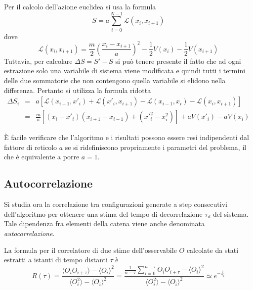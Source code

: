Per il calcolo dell'azione euclidea si usa la formula
$$S = a\displaystyle\sum\limits_{i=0}^{N-1} \mathcal{L}(x_{i},x_{i+1})$$
dove
$$\mathcal{L}(x_{i},x_{i+1}) = \frac{m}{2}\left(\frac{x_{i}-x_{i+1}}{a}\right)^{2}-\frac{1}{2}V(x_{i})-\frac{1}{2}V(x_{i+1})$$
Tuttavia, per calcolare $\Delta S = S'-S$ si può tenere presente il fatto che ad ogni estrazione solo una variabile di sistema viene modificata e quindi tutti i termini delle due sommatorie che non contengono quella variabile si elidono nella differenza. Pertanto si utilizza la formula ridotta
\begin{eqnarray*}
 \Delta S_i &=& a[\mathcal{L}(x_{i-1},x'_{i})+\mathcal{L}(x'_{i},x_{i+1})-\mathcal{L}(x_{i-1},x_{i})-\mathcal{L}(x_{i},x_{i+1})]\\
   &=& \tfrac{m}{a}[(x_{i}-x'_{i})(x_{i+1}+x_{i-1})+(x'^2_i-x^2_i)]+aV(x'_i)-aV(x_i)
\end{eqnarray*}

È facile verificare che l'algoritmo e i risultati possono essere resi indipendenti dal fattore di reticolo $a$ se si ridefiniscono propriamente i parametri del problema, il che è equivalente a porre $a=1$.
\newpage
\subsection{Autocorrelazione}

Si studia ora la correlazione tra configurazioni generate a step consecutivi dell'algoritmo per ottenere una stima del tempo di decorrelazione $\tau_d$ del sistema. Tale dipendenza fra elementi della catena viene anche denominata \textit{autocorrelazione}.

La formula per il correlatore di due stime dell'osservabile $O$ calcolate da stati estratti a istanti di tempo distanti $\tau$ è
$$R(\tau)=\frac{\langle O_iO_{i+\tau}\rangle-\langle O_i\rangle^2}{\langle O_i^2\rangle-\langle O_i\rangle^2}=\frac{\frac{1}{n-\tau}\sum\limits_{i=0}^{n-\tau}O_iO_{i+\tau}-\langle O_i\rangle^2}{\langle O_i^2\rangle-\langle O_i\rangle^2}\simeq e^{-\tfrac{\tau}{\tau_d}}$$

